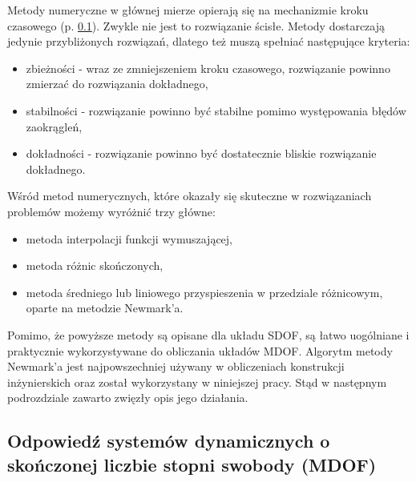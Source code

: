 Metody numeryczne w głównej mierze opierają się na mechanizmie kroku czasowego  (p. \ref{section: mdof_response}). Zwykle nie jest to rozwiązanie ścisłe. Metody dostarczają jedynie przybliżonych rozwiązań, dlatego też muszą spełniać następujące kryteria:
\begin{itemize}[noitemsep]
	\item zbieżności  - wraz ze zmniejszeniem kroku czasowego, rozwiązanie powinno zmierzać do rozwiązania dokładnego,
	\item stabilności  - rozwiązanie powinno być stabilne pomimo występowania błędów zaokrągleń,
	\item dokładności  - rozwiązanie powinno być dostatecznie bliskie rozwiązanie dokładnego.
\end{itemize}
Wśród metod numerycznych, które okazały się skuteczne w rozwiązaniach problemów możemy wyróżnić trzy główne:
\begin{itemize}[noitemsep]
\item metoda interpolacji funkcji wymuszającej,
\item metoda różnic skończonych,
\item metoda średniego lub liniowego przyspieszenia w przedziale różnicowym, oparte na metodzie Newmark'a.
\end{itemize}
Pomimo, że powyższe metody są opisane dla układu SDOF, są łatwo uogólniane i praktycznie wykorzystywane do obliczania układów MDOF. Algorytm metody Newmark'a jest najpowszechniej używany w obliczeniach konstrukcji inżynierskich oraz został wykorzystany w niniejszej pracy. Stąd w następnym podrozdziale zawarto zwięzły opis jego działania.


\subsection{Odpowiedź systemów dynamicznych o skończonej liczbie stopni swobody (MDOF)} \label{section: mdof_response}

